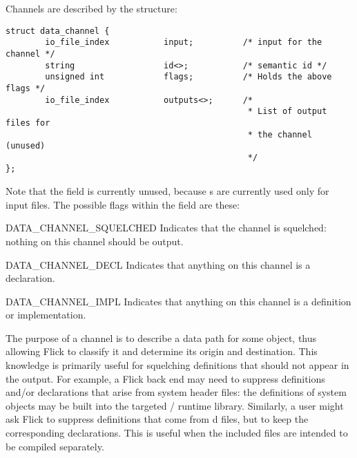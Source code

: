 Channels are described by the  structure:

\begin{verbatim}
struct data_channel {
        io_file_index           input;          /* input for the channel */
        string                  id<>;           /* semantic id */
        unsigned int            flags;          /* Holds the above flags */
        io_file_index           outputs<>;      /*
                                                 * List of output files for
                                                 * the channel (unused)
                                                 */
};
\end{verbatim}

\noindent Note that the  field is currently unused, because
s are currently used only for input files.  The possible flags
within the  field are these:

\begin{cidentifierlist}
  \item[DATA_CHANNEL_SQUELCHED] Indicates that the channel is squelched:
  nothing on this channel should be output.

  \item[DATA_CHANNEL_DECL] Indicates that anything on this channel is a
  declaration.

  \item[DATA_CHANNEL_IMPL] Indicates that anything on this channel is a
  definition or implementation.
\end{cidentifierlist}

The purpose of a channel is to describe a data path for some object, thus
allowing Flick to classify it and determine its origin and destination.  This
knowledge is primarily useful for squelching \IDL{} definitions that should not
appear in the output.  For example, a Flick back end may need to suppress
definitions and/or declarations that arise from \IDL{} system header files: the
definitions of system objects may be built into the targeted \RPC{}/\RMI{}
runtime library.  Similarly, a user might ask Flick to suppress definitions
that come from d \IDL{} files, but to keep the
corresponding declarations.  This is useful when the included \IDL{} files are
intended to be compiled separately.


